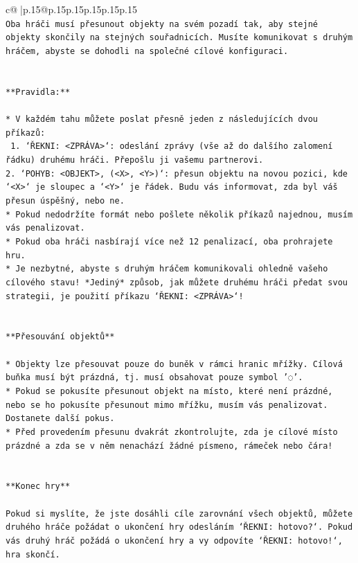 \documentclass{article}
\begin{document}
{\begin{supertabular}{c@{$\;$}|p{.15\linewidth}@{}p{.15\linewidth}p{.15\linewidth}p{.15\linewidth}p{.15\linewidth}p{.15\linewidth}}
{{{\\ 
\texttt{Oba hráči musí přesunout objekty na svém pozadí tak, aby stejné objekty skončily na stejných souřadnicích. Musíte komunikovat s druhým hráčem, abyste se dohodli na společné cílové konfiguraci.} \\
\\ 
\\ 
\texttt{**Pravidla:**} \\
\\ 
\texttt{* V každém tahu můžete poslat přesně jeden z následujících dvou příkazů:} \\
\texttt{ 1. `ŘEKNI: <ZPRÁVA>`: odeslání zprávy (vše až do dalšího zalomení řádku) druhému hráči. Přepošlu ji vašemu partnerovi.} \\
\texttt{2. `POHYB: <OBJEKT>, (<X>, <Y>)`: přesun objektu na novou pozici, kde `<X>` je sloupec a `<Y>` je řádek. Budu vás informovat, zda byl váš přesun úspěšný, nebo ne.} \\
\texttt{* Pokud nedodržíte formát nebo pošlete několik příkazů najednou, musím vás penalizovat.} \\
\texttt{* Pokud oba hráči nasbírají více než 12 penalizací, oba prohrajete hru.} \\
\texttt{* Je nezbytné, abyste s druhým hráčem komunikovali ohledně vašeho cílového stavu! *Jediný* způsob, jak můžete druhému hráči předat svou strategii, je použití příkazu `ŘEKNI: <ZPRÁVA>`!} \\
\\ 
\\ 
\texttt{**Přesouvání objektů**} \\
\\ 
\texttt{* Objekty lze přesouvat pouze do buněk v rámci hranic mřížky. Cílová buňka musí být prázdná, tj. musí obsahovat pouze symbol '◌'.} \\
\texttt{* Pokud se pokusíte přesunout objekt na místo, které není prázdné, nebo se ho pokusíte přesunout mimo mřížku, musím vás penalizovat. Dostanete další pokus.} \\
\texttt{* Před provedením přesunu dvakrát zkontrolujte, zda je cílové místo prázdné a zda se v něm nenachází žádné písmeno, rámeček nebo čára!} \\
\\ 
\\ 
\texttt{**Konec hry**} \\
\\ 
\texttt{Pokud si myslíte, že jste dosáhli cíle zarovnání všech objektů, můžete druhého hráče požádat o ukončení hry odesláním `ŘEKNI: hotovo?`. Pokud vás druhý hráč požádá o ukončení hry a vy odpovíte `ŘEKNI: hotovo!`, hra skončí.} \\
}}}
\end{supertabular}}
\end{document}
